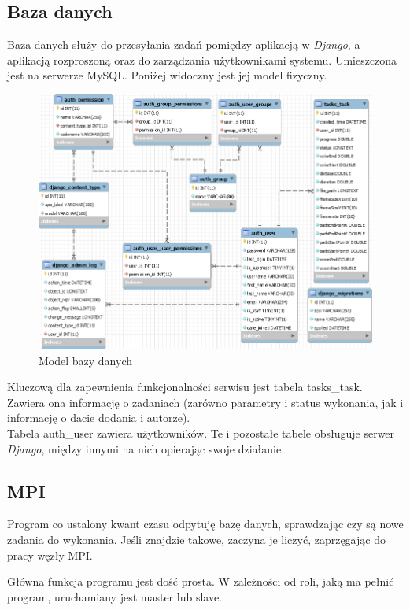 \documentclass[a4paper]{article}
\begin{document}
\subsection{Baza danych}
Baza danych służy do przesyłania zadań pomiędzy aplikacją w \textit{Django}, a aplikacją rozproszoną oraz do zarządzania użytkownikami systemu. Umieszczona jest na serwerze MySQL. Poniżej widoczny jest jej model fizyczny.
 \begin{figure}[H]
    \centering
    \includegraphics[width=\textwidth]{sql.png}
    \caption{Model bazy danych}
    \label{fig:db}
\end{figure}

Kluczową dla zapewnienia funkcjonalności serwisu jest tabela tasks\_task. Zawiera ona informację o zadaniach (zarówno parametry i status wykonania, jak i informację o dacie dodania i autorze). \\
Tabela auth\_user zawiera użytkowników. Te i pozostałe tabele obsługuje serwer \textit{Django}, między innymi na nich opierając swoje działanie.

\subsection{MPI}
Program co ustalony kwant czasu odpytuję bazę danych, sprawdzając czy są nowe zadania do wykonania. Jeśli znajdzie takowe, zaczyna je liczyć, zaprzęgając do pracy węzły MPI.

Główna funkcja programu jest dość prosta. W zależności od roli, jaką ma pełnić program, uruchamiany jest master lub slave.
\end{document}
